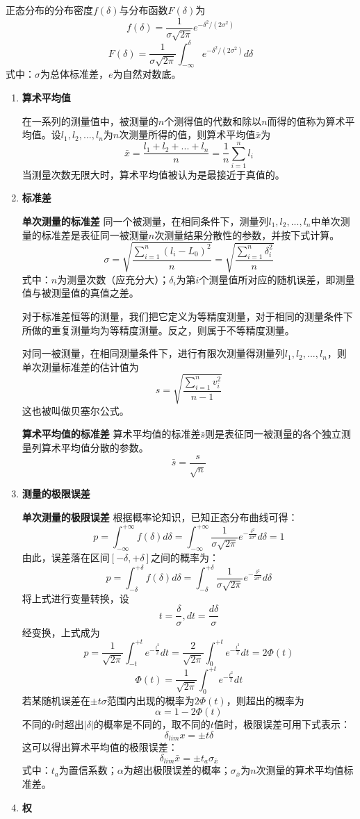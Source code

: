 正态分布的分布密度$ f(\delta) $与分布函数$ F(\delta) $为\[ f(\delta)=\frac{1}{\sigma\sqrt{2\pi}}e^{-\delta^2/(2\sigma^2)} \]\[ F(\delta)=\frac{1}{\sigma\sqrt{2\pi}}\int_{-\infty}^{\delta}e^{-\delta^2/(2\sigma^2)}d\delta \]
式中：$ \sigma $为总体标准差，$ e $为自然对数底。
\begin{enumerate}
	\item \textbf{算术平均值}
	
	在一系列的测量值中，被测量的$ n $个测得值的代数和除以$ n $而得的值称为算术平均值。设$ l_1,l_2,...,l_n $为$ n $次测量所得的值，则算术平均值$ \bar{x} $为\[ \bar{x}=\frac{l_1+l_2+...+l_n}{n}=\frac{1}{n}\sum_{i=1}^{n}l_i \]
	当测量次数无限大时，算术平均值被认为是最接近于真值的。
	\item \textbf{标准差}
	
	\textbf{单次测量的标准差 } 同一个被测量，在相同条件下，测量列$ l_1,l_2,...,l_n $中单次测量的标准差是表征同一被测量$ n $次测量结果分散性的参数，并按下式计算。
	\[ \sigma=\sqrt{\frac{\sum\limits_{i=1}^{n}(l_i-L_0)^2}{n}}=\sqrt{\frac{\sum\limits_{i=1}^{n}\delta_i^2}{n}} \]
	式中：$ n $为测量次数（应充分大）；$ \delta_i $为第$ i $个测量值所对应的随机误差，即测量值与被测量值的真值之差。
	
	对于标准差恒等的测量，我们把它定义为等精度测量，对于相同的测量条件下所做的重复测量均为等精度测量。反之，则属于不等精度测量。
	
	对同一被测量，在相同测量条件下，进行有限次测量得测量列$ l_1,l_2,...,l_n $，则单次测量标准差的估计值为\[ s=\sqrt{\frac{\sum\limits_{i=1}^{n}v_i^2}{n-1}} \]
	这也被叫做贝塞尔公式。
	
	\textbf{算术平均值的标准差 } 算术平均值的标准差$ \bar{s} $则是表征同一被测量的各个独立测量列算术平均值分散的参数。\[ \bar{s}=\frac{s}{\sqrt{n}} \]
	\item \textbf{测量的极限误差}
	
	\textbf{单次测量的极限误差 } 根据概率论知识，已知正态分布曲线可得：\[ p=\int_{-\infty}^{+\infty}f(\delta)d\delta=\int_{-\infty}^{+\infty}\frac{1}{\sigma\sqrt{2\pi}}e^{-\frac{\delta^2}{2\sigma^2}}d\delta=1 \]
	由此，误差落在区间$ [-\delta,+\delta] $之间的概率为：\[ p=\int_{-\delta}^{+\delta}f(\delta)d\delta=\int_{-\delta}^{+\delta}\frac{1}{\sigma\sqrt{2\pi}}e^{-\frac{\delta^2}{2\sigma^2}}d\delta \]
	将上式进行变量转换，设\[ t=\frac{\delta}{\sigma},dt=\frac{d\delta}{\sigma} \]
	经变换，上式成为\[ p=\frac{1}{\sqrt{2\pi}}\int_{-t}^{+t}e^{-\frac{t^2}{2}}dt=\frac{2}{\sqrt{2\pi}}\int_{0}^{+t}e^{-\frac{t^2}{2}}dt=2\Phi(t) \]
	\[ \Phi(t)=\frac{1}{\sqrt{2\pi}}\int_{0}^{+t}e^{-\frac{t^2}{2}}dt \]
	若某随机误差在$ \pm t\sigma $范围内出现的概率为$ 2\Phi(t) $，则超出的概率为\[ \alpha=1-2\Phi(t) \]
	不同的$ t $时超出$ |\delta| $的概率是不同的，取不同的$ t $值时，极限误差可用下式表示：\[ \delta_{lim}x=\pm t\delta \]
	这可以得出算术平均值的极限误差：\[ \delta_{lim}\bar{x}=\pm t_a\sigma_{\bar{x}} \]
	式中：$ t_a $为置信系数；$ \alpha $为超出极限误差的概率；$ \sigma_{\bar{x}} $为$ n $次测量的算术平均值标准差。
	\item \textbf{权}
	

\end{enumerate}

